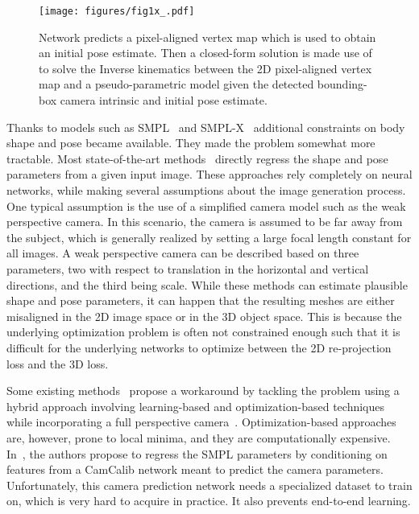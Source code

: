 \documentclass[10pt,twocolumn,letterpaper]{article}
\begin{document}
\begin{figure}[!t]
\begin{center}
\texttt{[image: figures/fig1x\_.pdf]}
\end{center}
   \caption{Network predicts a  pixel-aligned vertex map  which is used to obtain an initial pose estimate. Then a closed-form solution is made use of to solve the Inverse kinematics between the 2D pixel-aligned vertex map  and a pseudo-parametric model given the detected bounding-box camera intrinsic and initial pose estimate.   
   }
\label{fig-1}
\end{figure}

Thanks to models such as SMPL~\cite{smpl} and SMPL-X~\cite{SMPL-X:2019} additional constraints on body shape and pose became available. They made the problem somewhat more tractable. 
Most state-of-the-art methods~\cite{spin,eft,hmr,pare,romp} directly regress the shape and pose parameters from a given input image. These approaches rely completely on neural networks,
while making several assumptions about the image generation process. One typical assumption is the use of a  simplified camera model such as the weak perspective camera. In this scenario, the camera is assumed to be far away from the subject, which is generally realized by setting a large focal length constant for all  images. A weak perspective camera can be described based on  three parameters, two with respect to translation in the horizontal and vertical directions, and the third being scale. While these methods can estimate plausible shape and pose parameters, it can happen that the resulting meshes are either misaligned in the 2D image space or in the 3D object space. This is because the underlying optimization problem is often not constrained enough such that it is difficult for the underlying networks to optimize between the 2D re-projection loss and the 3D loss.





Some existing methods~\cite{wpc,spec,cliff} propose a workaround by tackling the problem using a hybrid approach involving learning-based and optimization-based techniques while incorporating a full perspective camera~\cite{wpc}. Optimization-based approaches are, however, prone to local minima, and they are computationally expensive. In~\cite{spec}, the authors propose to regress the SMPL parameters by conditioning on features from a CamCalib network meant to predict the camera parameters. Unfortunately, this camera prediction network needs a specialized dataset to train on, which is very hard to acquire in practice. It also prevents end-to-end learning.  
\end{document}
